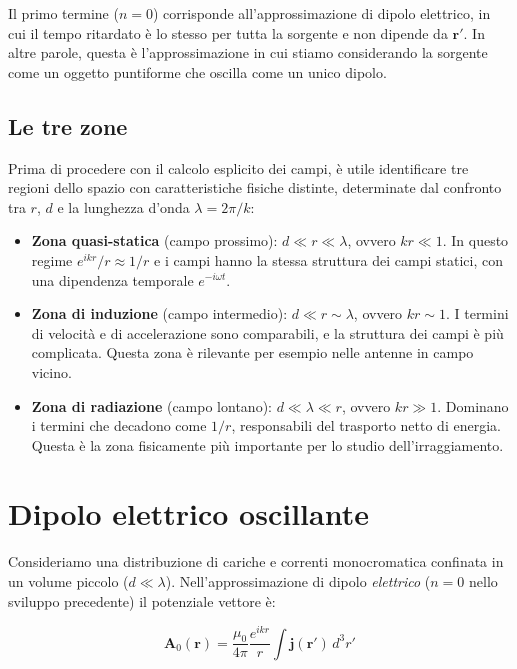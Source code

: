Il primo termine ($n=0$) corrisponde all'approssimazione di dipolo elettrico, in cui il tempo ritardato è lo stesso per tutta la sorgente e non dipende da $\mathbf{r'}$. In altre parole, questa è l'approssimazione in cui stiamo considerando la sorgente come un oggetto puntiforme che oscilla come un unico dipolo.

\subsection{Le tre zone}

Prima di procedere con il calcolo esplicito dei campi, è utile identificare tre regioni dello spazio con caratteristiche fisiche distinte, determinate dal confronto tra $r$, $d$ e la lunghezza d'onda $\lambda = 2\pi/k$:

\begin{itemize}
    \item \textbf{Zona quasi-statica} (campo prossimo): $d \ll r \ll \lambda$, 
    ovvero $kr \ll 1$. In questo regime $e^{ikr}/r \approx 1/r$ e i campi 
    hanno la stessa struttura dei campi statici, con una dipendenza 
    temporale $e^{-i\omega t}$.

    \item \textbf{Zona di induzione} (campo intermedio): $d \ll r \sim \lambda$, 
    ovvero $kr \sim 1$. I termini di velocità e di accelerazione sono 
    comparabili, e la struttura dei campi è più complicata. Questa zona 
    è rilevante per esempio nelle antenne in campo vicino.

    \item \textbf{Zona di radiazione} (campo lontano): $d \ll \lambda \ll r$, 
    ovvero $kr \gg 1$. Dominano i termini che decadono come $1/r$, 
    responsabili del trasporto netto di energia. Questa è la zona 
    fisicamente più importante per lo studio dell'irraggiamento.
\end{itemize}

\newpage

\section{Dipolo elettrico oscillante}

Consideriamo una distribuzione di cariche e correnti monocromatica confinata in un volume piccolo ($d \ll \lambda$). Nell'approssimazione di dipolo \emph{elettrico} ($n=0$ nello sviluppo precedente) il potenziale vettore è:

\begin{equation}
    \mathbf{A}_0(\mathbf{r}) = \frac{\mu_0}{4\pi} \frac{e^{ikr}}{r} 
    \int \mathbf{j}(\mathbf{r'}) \, d^3r'
\end{equation}

